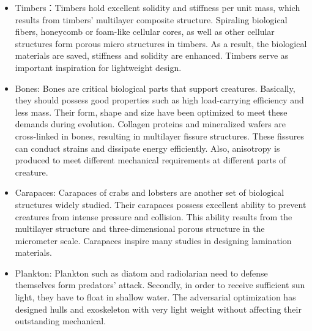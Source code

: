 \begin{itemize}
\item Timbers：Timbers hold excellent solidity and stiffness per unit mass, which results from timbers’ multilayer composite structure. Spiraling biological fibers, honeycomb or foam-like cellular cores, as well as other cellular structures form porous micro structures in timbers. As a result, the biological materials are saved, stiffness and solidity are enhanced. Timbers serve as important inspiration for lightweight design.

\item Bones: Bones are critical biological parts that support creatures. Basically, they should possess good properties such as high load-carrying efficiency and less mass. Their form, shape and size have been optimized to meet these demands during evolution. Collagen proteins and mineralized wafers are cross-linked in bones, resulting in multilayer fissure structures. These fissures can conduct strains and dissipate energy efficiently. Also, anisotropy is produced to meet different mechanical requirements at different parts of creature.

\item Carapaces: Carapaces of crabs and lobsters are another set of biological structures widely studied. Their carapaces possess excellent ability to prevent creatures from intense pressure and collision. This ability results from the multilayer structure and three-dimensional porous structure in the micrometer scale. Carapaces inspire many studies in designing lamination materials.

\item Plankton: Plankton such as diatom and radiolarian need to defense themselves form predators’ attack. Secondly, in order to receive sufficient sun light, they have to float in shallow water. The adversarial optimization has designed hulls and exoskeleton with very light weight without affecting their outstanding mechanical. \\
\end{itemize}

